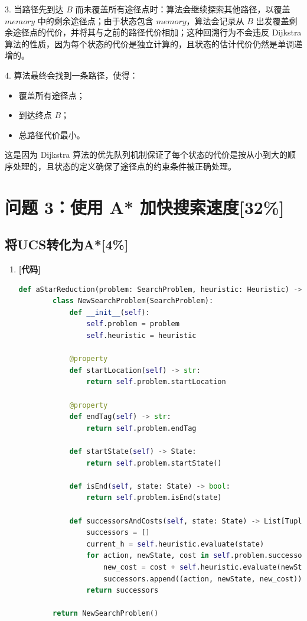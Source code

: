 \documentclass{article}
\begin{document}
\begin{enumerate}[label=(\alph*), start=3]
    3. 当路径先到达 \( B \) 而未覆盖所有途径点时：算法会继续探索其他路径，以覆盖 \( memory \) 中的剩余途径点；由于状态包含 \( memory \)，算法会记录从 \( B \) 出发覆盖剩余途径点的代价，并将其与之前的路径代价相加；这种回溯行为不会违反 Dijkstra 算法的性质，因为每个状态的代价是独立计算的，且状态的估计代价仍然是单调递增的。
    
    4. 算法最终会找到一条路径，使得：
    \begin{itemize}
    	\item 覆盖所有途径点；
    	\item 到达终点 \( B \)；
    	\item 总路径代价最小。
    \end{itemize}
    
    这是因为 Dijkstra 算法的优先队列机制保证了每个状态的代价是按从小到大的顺序处理的，且状态的定义确保了途径点的约束条件被正确处理。
    
    
\end{enumerate}

\section{问题 3：使用 A* 加快搜索速度[32\%]}

\subsection{将UCS转化为A*[4\%]}

\begin{enumerate}[label=(\alph*), start=1]
    \item \textbf{[代码]} %
    \begin{lstlisting}[language=Python]
    def aStarReduction(problem: SearchProblem, heuristic: Heuristic) -> SearchProblem:
    	class NewSearchProblem(SearchProblem):
    		def __init__(self):
    			self.problem = problem
    			self.heuristic = heuristic
    
    		@property
    		def startLocation(self) -> str:
    			return self.problem.startLocation
    
    		@property
    		def endTag(self) -> str:
    			return self.problem.endTag
    
    		def startState(self) -> State:
    			return self.problem.startState()
    
    		def isEnd(self, state: State) -> bool:
    			return self.problem.isEnd(state)
    
    		def successorsAndCosts(self, state: State) -> List[Tuple[str, State, float]]:
    			successors = []
    			current_h = self.heuristic.evaluate(state)
    			for action, newState, cost in self.problem.successorsAndCosts(state):
    				new_cost = cost + self.heuristic.evaluate(newState) - current_h
    				successors.append((action, newState, new_cost))
    			return successors
    
    	return NewSearchProblem()
    \end{lstlisting}
\end{enumerate}
\end{document}
